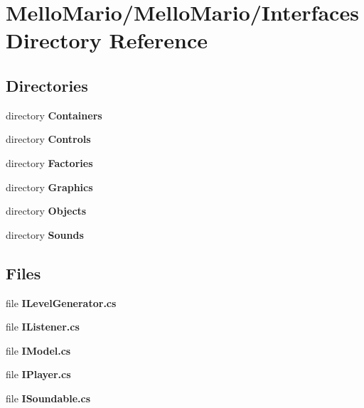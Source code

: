 \section{Mello\+Mario/\+Mello\+Mario/\+Interfaces Directory Reference}
\label{dir_743020d618ed3ea590b5597eef6b5f10}
\subsection*{Directories}
\begin{DoxyCompactItemize}
\item 
directory \textbf{ Containers}
\item 
directory \textbf{ Controls}
\item 
directory \textbf{ Factories}
\item 
directory \textbf{ Graphics}
\item 
directory \textbf{ Objects}
\item 
directory \textbf{ Sounds}
\end{DoxyCompactItemize}
\subsection*{Files}
\begin{DoxyCompactItemize}
\item 
file \textbf{ I\+Level\+Generator.\+cs}
\item 
file \textbf{ I\+Listener.\+cs}
\item 
file \textbf{ I\+Model.\+cs}
\item 
file \textbf{ I\+Player.\+cs}
\item 
file \textbf{ I\+Soundable.\+cs}
\end{DoxyCompactItemize}
